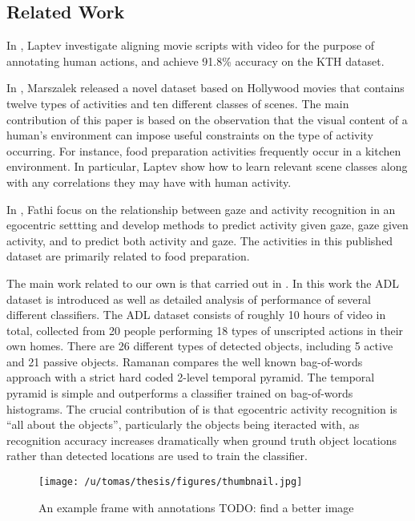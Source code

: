 \documentclass[10pt,twocolumn,letterpaper]{article}
\begin{document}

\subsection{Related Work}


	In \cite{Laptev08}, Laptev \etal investigate aligning movie scripts with
	video for the purpose of annotating human actions, and achieve 91.8\%
	accuracy on the KTH dataset.
	
	In \cite{Marszalek09}, Marszalek \etal released a novel dataset based on
	Hollywood movies that contains twelve types of activities and ten
	different classes of scenes. The main contribution of this paper is based
	on the observation that the visual content of a human's environment can
	impose useful constraints on the type of activity occurring. For instance,
	food preparation activities frequently occur in a kitchen environment. In
	particular, Laptev \etal show how to learn relevant scene classes along
	with any correlations they may have with human activity.
	
	In \cite{Fathi12}, Fathi \etal focus on the relationship between gaze and
	activity recognition in an egocentric settting and develop methods to
	predict activity given gaze, gaze given activity, and to predict both
	activity and gaze. The activities in this
	published dataset are primarily related to food preparation. 
	
	The main work related to our own is that carried out in \cite{Ramanan12}. 
	In this work the ADL dataset is introduced as well as detailed analysis of
	performance of several different classifiers. The ADL dataset consists of
	roughly 10 hours of video in total, collected from 20 people performing
	18 types of unscripted actions in their own homes. There are 26 different 
	types of detected objects, including 5 active and 21 passive objects. 
  Ramanan compares the well known bag-of-words approach with a strict hard coded
  2-level temporal pyramid. The temporal pyramid is simple and outperforms a 
  classifier trained on bag-of-words histograms.
	The crucial contribution of
	\cite{Ramanan12} is that egocentric activity recognition is ``all about
	the objects'', particularly the objects being iteracted with, as
	recognition accuracy increases dramatically when ground truth object
	locations rather than detected locations are used to train the classifier. 

	\begin{figure}[t]
		\begin{center}
			  \texttt{[image: /u/tomas/thesis/figures/thumbnail.jpg]}
		\end{center}
		   \caption{An example frame with annotations TODO: find a better image}
				\label{fig:long}
				\label{fig:onecol}
	\end{figure}
	
\end{document}
